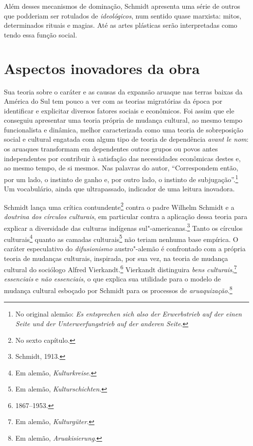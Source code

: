Além desses mecanismos de dominação, Schmidt apresenta uma série de
outros que podderiam ser rotulados de \textit{ideológicos}, num sentido quase
marxista: mitos, determinados rituais e magias. Até as artes plásticas
serão interpretadas como tendo essa função social.

\section{Aspectos inovadores da obra}

Sua teoria sobre o caráter e as causas da expansão aruaque nas
terras baixas da América do Sul tem pouco a ver com as teorias
migratórias da época por identificar e explicitar diversos fatores
sociais e econômicos. Foi assim que ele conseguiu apresentar uma teoria
própria de mudança cultural, ao mesmo tempo funcionalista e dinâmica, melhor 
caracterizada como uma teoria de sobreposição
social e cultural engatada com algum tipo de teoria de dependência
\textit{avant le nom}: os aruaques transformam em dependentes outros
grupos ou povos antes independentes por contribuir à satisfação das
necessidades econômicas destes e, ao mesmo tempo, de si mesmos. Nas palavras do autor, 
``Correspondem então, por um lado, o instinto de
ganho e, por outro lado, o instinto de subjugação''.\footnote{No original alemão: \textit{Es entsprechen sich also der Erwerbstrieb auf der einen Seite und der
Unterwerfungstrieb auf der anderen Seite}.} Um vocabulário,
ainda que ultrapassado, indicador de uma leitura inovadora.

Schmidt lança uma crítica contundente\footnote{No sexto capítulo.} contra o padre Wilhelm
Schmidt e a \textit{doutrina dos círculos culturais}, em particular contra a
aplicação dessa teoria para explicar a diversidade das culturas
indígenas sul"-americanas.\footnote{Schmidt, 1913.} Tanto os círculos culturais\footnote{Em alemão, \textit{Kulturkreise}.} quanto as camadas culturais\footnote{Em alemão, \textit{Kulturschichten}.} não teriam nenhuma base empírica. O caráter
especulativo do \textit{difusionismo} austro"-alemão é confrontado com a própria
teoria de mudanças culturais, inspirada, por sua vez, na teoria de
mudança cultural do sociólogo Alfred Vierkandt.\footnote{1867--1953.} Vierkandt distinguira \textit{bens culturais},\footnote{Em alemão, \textit{Kulturgüter}.} \textit{essenciais} e \textit{não essenciais}, o que explica
sua utilidade para o modelo de mudança cultural esboçado por Schmidt
para os processos de \textit{aruaquização}.\footnote{Em alemão, \textit{Aruakisierung}.}


